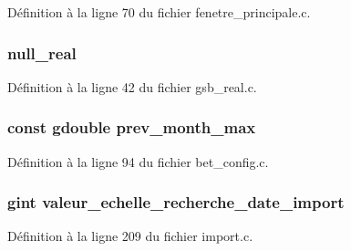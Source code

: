 Définition à la ligne 70 du fichier fenetre\_\-principale.c.

\subsubsection[{null\_\-real}]{ {\bf null\_\-real}}\label{bet__tab_8c_a26f304bec3fdc0651b9aa8765d4de3c6}


Définition à la ligne 42 du fichier gsb\_\-real.c.

\subsubsection[{prev\_\-month\_\-max}]{\setlength{\rightskip}{0pt plus 5cm}const gdouble {\bf prev\_\-month\_\-max}}\label{bet__tab_8c_a2a9036317d63fb6459987ed41b88bf4f}


Définition à la ligne 94 du fichier bet\_\-config.c.

\subsubsection[{valeur\_\-echelle\_\-recherche\_\-date\_\-import}]{\setlength{\rightskip}{0pt plus 5cm}gint {\bf valeur\_\-echelle\_\-recherche\_\-date\_\-import}}\label{bet__tab_8c_abd82865835fd6c5fcfe97283dbfd0648}


Définition à la ligne 209 du fichier import.c.

